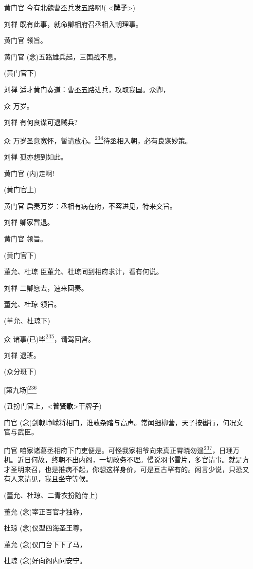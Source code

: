 黄门官 今有北魏曹丕兵发五路啊!( \textless{}\textbf{牌子}\textgreater{})

刘禅 既有此事，就命卿相府召丞相入朝理事。

黄门官 领旨。

黄门官 (念)五路雄兵起，三国战不息。

(黄门官下)

刘禅 适才黄门奏道：曹丕五路进兵，攻取我国。众卿，

众 万岁。

刘禅 有何良谋可退贼兵?

众
万岁圣意宽怀，暂请放心。\protect\hyperlink{fn234}{\textsuperscript{234}}待丞相入朝，必有良谋妙策。

刘禅 孤亦想到如此。

黄门官 (内)走啊!

(黄门官上)

黄门官 启奏万岁：丞相有病在府，不容进见，特来交旨。

刘禅 卿家暂退。

黄门官 领旨。

(黄门官下)

董允、杜琼 臣董允、杜琼同到相府求计，看有何说。

刘禅 二卿愿去，速来回奏。

董允、杜琼 领旨。

(董允、杜琼下)

众
诸事(已)毕\protect\hyperlink{fn235}{\textsuperscript{235}}，请驾回宫。

刘禅 退班。

(众分班下)

{[}第九场{]}\protect\hyperlink{fn236}{\textsuperscript{236}}

(丑扮门官上，\textless{}\textbf{普贤歌}\textgreater{}干牌子)

门官
(念)剑戟峥嵘将相门，谁敢杂踏与高声。常闻细柳营，天子按辔行，何况文官与武臣。

门官
咱家诸葛丞相府下门吏便是。可怪我家相爷向来真正霄晓勿遑\protect\hyperlink{fn237}{\textsuperscript{237}}，日理万机。近日何故，终朝不出内阁，一切政务不理。慢说羽书雪片，多官请事。就是方才圣明来召，也是推病不起，你想这样身价，可是亘古罕有的。闲言少说，只恐又有人来请见，我且坐守等候。

(董允、杜琼、二青衣扮随侍上)

董允 (念)宰正百官才独称，

杜琼 (念)仪型四海圣王尊。

董允 (念)仪门台下下了马，

杜琼 (念)好向阁内问安宁。

